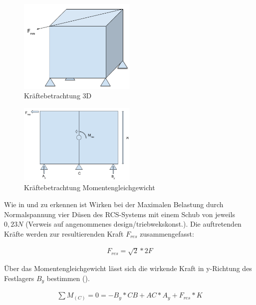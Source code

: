 \begin{figure}[h]
	\centering
		\includegraphics[width=0.50\textwidth]{graphics/Gecko_Rechnung2.png}
	\caption{Kräftebetrachtung 3D}
	\label{fig:Gecko_Rechnung2}
\end{figure}

\begin{figure}[h]
	\centering
		\includegraphics[width=0.50\textwidth]{graphics/Gecko_Rechnung3.png}
	\caption{Kräftebetrachtung Momentengleichgewicht}
	\label{fig:Gecko_Rechnung3}
\end{figure}


Wie in  und  zu erkennen ist Wirken bei der Maximalen Belastung durch Normalspannung vier Düsen des RCS-Systems mit einem Schub von jeweils $0,23 N$ (Verweis auf angenommenes design/triebwekskonst.). Die auftretenden Kräfte werden zur resultierenden Kraft $F_{res}$  zusammengefasst:

	\begin{eqnarray}
			F_{res}=\sqrt{ 2 }*2F
	\end{eqnarray}

Über das Momentengleichgewicht lässt sich die wirkende Kraft in y-Richtung des Festlagers $B_y$  bestimmen ().

\begin{eqnarray}
		\sum{  }{  }{ M_{(C)} }=0=-B_y*CB+AC*A_y+F_{res}*K
\end{eqnarray}

